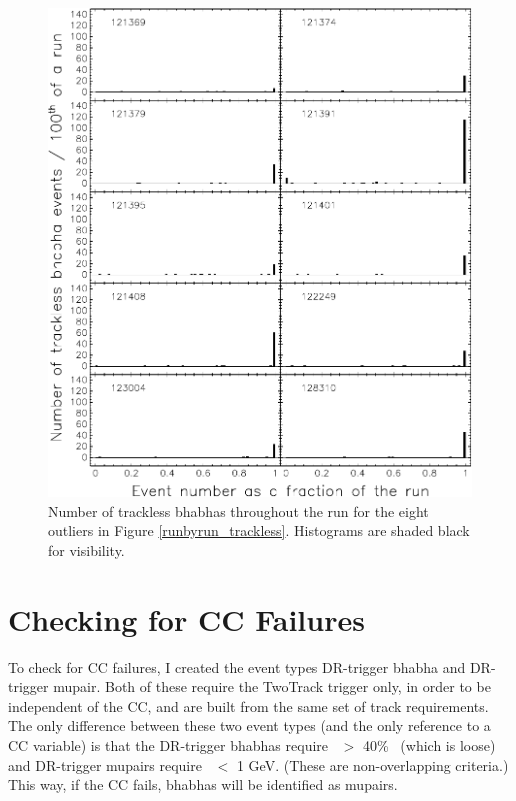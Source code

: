 \begin{figure}[p]
  \includegraphics[width=\linewidth]{plots/runbyrun_trackless2}
  \caption{\label{runbyrun_trackless2} Number of trackless bhabhas
  throughout the run for the eight outliers in Figure
  \ref{runbyrun_trackless}.  Histograms are shaded black for
  visibility.}
\end{figure}

\section{Checking for CC Failures}

To check for CC failures, I created the event types DR-trigger bhabha
and DR-trigger mupair.  Both of these require the TwoTrack trigger
only, in order to be independent of the CC, and are built from the
same set of track requirements.  The only difference between these two
event types (and the only reference to a CC variable) is that the
DR-trigger bhabhas require \etwo\ $>$ 40\% \ebeam\ (which is loose)
and DR-trigger mupairs require \etwo\ $<$ 1 GeV.  (These are
non-overlapping criteria.)  This way, if the CC fails, bhabhas will be
identified as mupairs.

